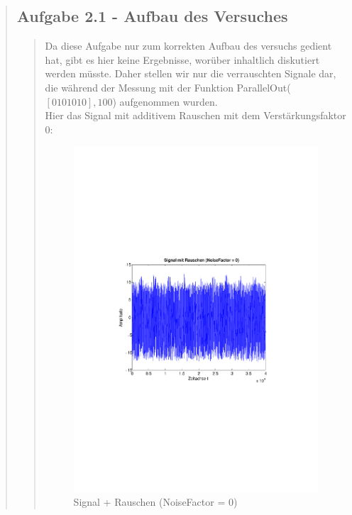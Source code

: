 \begin{quote}
\begin{quote}
    \end{quote}  %
    
    \subsection{Aufgabe 2.1 - Aufbau des Versuches}
    \begin{quote}
        
        Da diese Aufgabe nur zum korrekten Aufbau des versuchs gedient hat, gibt
        es hier keine Ergebnisse, worüber inhaltlich diskutiert werden müsste.
        Daher stellen wir nur die verrauschten Signale dar, die während der
        Messung mit der Funktion ParallelOut($[0 1 0 1 0 1 0],100$) aufgenommen
        wurden.\\
        
        Hier das Signal mit additivem Rauschen mit dem Verstärkungsfaktor $0$:
        
         \begin{figure}[H]
        \centering
            \includegraphics[scale=0.65, trim = 1.5cm 9cm 1.5cm 9cm,
            clip]{./Bilder/aufgabe1/nf0}
                \caption{Signal + Rauschen (NoiseFactor = 0)}
        \end{figure}
        

\end{quote}
\end{quote}

